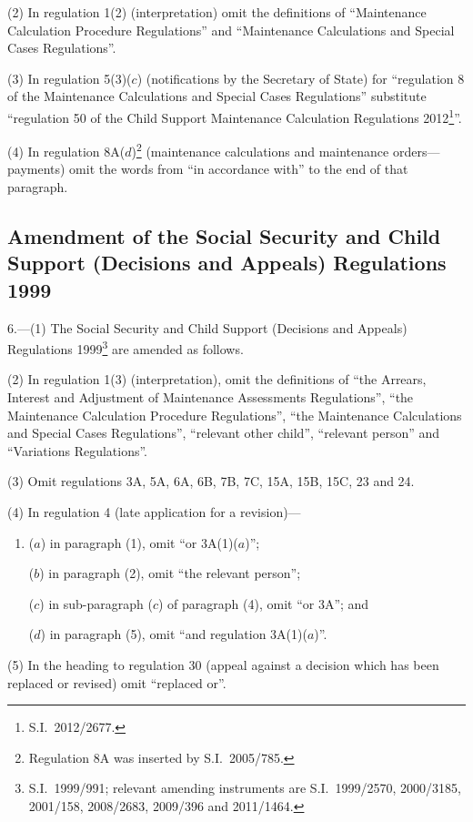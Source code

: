 \documentclass[12pt,a4paper]{article}
\begin{document}
(2) In regulation 1(2) (interpretation) omit the definitions of “Maintenance Calculation Procedure Regulations” and “Maintenance Calculations and Special Cases Regulations”.

(3) In regulation 5(3)($c$)  (notifications by the Secretary of State) for “regulation 8 of the Maintenance Calculations and Special Cases Regulations” substitute “regulation 50 of the Child Support Maintenance Calculation Regulations 2012\footnote{S.I.~2012/2677.}”.

(4) In regulation 8A($d$)\footnote{Regulation 8A was inserted by S.I.~2005/785.} (maintenance calculations and maintenance orders---payments) omit the words from “in accordance with” to the end of that paragraph.

\subsection[6. Amendment of the Social Security and Child Support (Decisions and Appeals) Regulations 1999]{Amendment of the Social Security and Child Support (Decisions and Appeals) Regulations 1999}

6.---(1)  The Social Security and Child Support (Decisions and Appeals) Regulations 1999\footnote{S.I.~1999/991; relevant amending instruments are S.I.~1999/2570, 2000/3185, 2001/158, 2008/2683, 2009/396 and 2011/1464.} are amended as follows.

(2) In regulation 1(3) (interpretation), omit the definitions of “the Arrears, Interest and Adjustment of Maintenance Assessments Regulations”, “the Maintenance Calculation Procedure Regulations”, “the Maintenance Calculations and Special Cases Regulations”, “relevant other child”, “relevant person” and “Variations Regulations”.

(3) Omit regulations 3A, 5A, 6A, 6B, 7B, 7C, 15A, 15B, 15C, 23 and 24.

(4) In regulation 4 (late application for a revision)—
\begin{enumerate}\item[]
($a$) in paragraph (1), omit “or 3A(1)($a$)”;

($b$) in paragraph (2), omit “the relevant person”;

($c$) in sub-paragraph ($c$)  of paragraph (4), omit “or 3A”; and

($d$) in paragraph (5), omit “and regulation 3A(1)($a$)”.
\end{enumerate}

(5) In the heading to regulation 30 (appeal against a decision which has been replaced or revised) omit “replaced or”.
\end{document}
